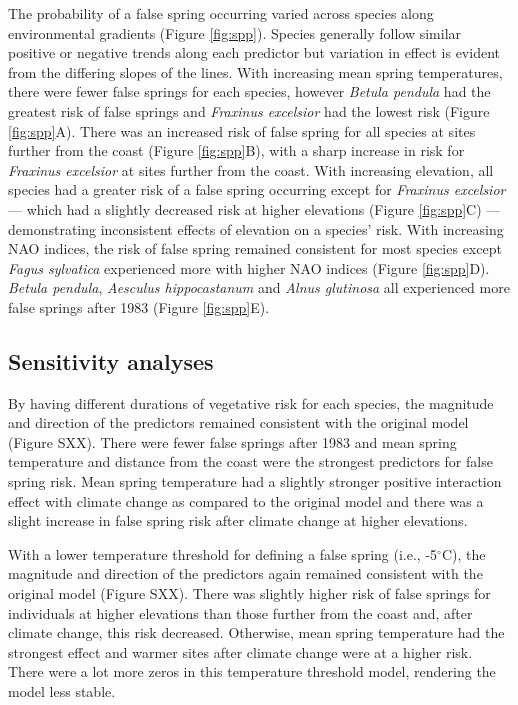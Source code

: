 \documentclass{article}\usepackage[]{graphicx}\usepackage[]{color}
\begin{document}
The probability of a false spring occurring varied across species along environmental gradients (Figure \ref{fig:spp}). Species generally follow similar positive or negative trends along each predictor but variation in effect is evident from the differing slopes of the lines. With increasing mean spring temperatures, there were fewer false springs for each species, however \textit{Betula pendula} had the greatest risk of false springs and \textit{Fraxinus excelsior} had the lowest risk (Figure \ref{fig:spp}A). There was an increased risk of false spring for all species at sites further from the coast (Figure \ref{fig:spp}B), with a sharp increase in risk for \textit{Fraxinus excelsior} at sites further from the coast. With increasing elevation, all species had a greater risk of a false spring occurring except for \textit{Fraxinus excelsior} --- which had a slightly decreased risk at higher elevations (Figure \ref{fig:spp}C) --- demonstrating inconsistent effects of elevation on a species' risk.  With increasing NAO indices, the risk of false spring remained consistent for most species except \textit{Fagus sylvatica} experienced more with higher NAO indices (Figure \ref{fig:spp}D). \textit{Betula pendula}, \textit{Aesculus hippocastanum} and \textit{Alnus glutinosa} all experienced more false springs after 1983 (Figure \ref{fig:spp}E). %

\subsection*{Sensitivity analyses}
By having different durations of vegetative risk for each species, the magnitude and direction of the predictors remained consistent with the original model (Figure SXX). There were fewer false springs after 1983 and mean spring temperature and distance from the coast were the strongest predictors for false spring risk. Mean spring temperature had a slightly stronger positive interaction effect with climate change as compared to the original model and there was a slight increase in false spring risk after climate change at higher elevations. 

With a lower temperature threshold for defining a false spring (i.e., -5$^{\circ}$C), the magnitude and direction of the predictors again remained consistent with the original model (Figure SXX). There was slightly higher risk of false springs for individuals at higher elevations than those further from the coast and, after climate change, this risk decreased. Otherwise, mean spring temperature had the strongest effect and warmer sites after climate change were at a higher risk. There were a lot more zeros in this temperature threshold model, rendering the model less stable.
\end{document}
